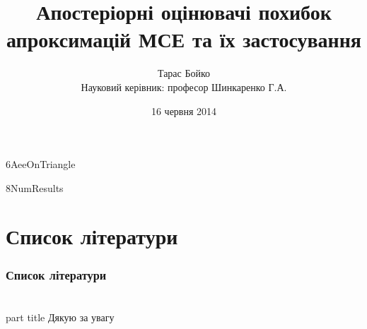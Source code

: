 \documentclass[12pt]{beamer}
\title[Апостеріорні оцінювачі похибок МСЕ]{Апостеріорні оцінювачі похибок апроксимацій МСЕ та їх застосування}
\author[Тарас Бойко]{Тарас Бойко\\[0.4cm] \footnotesize Науковий керівник: професор Шинкаренко Г.А.}
\date{16 червня 2014}
\begin{document}
	

	
	
	
	
	
	{6AeeOnTriangle}
	
	{8NumResults}

	

	\section{Список літератури}
	\frame{\sectionpage}
	\begin{frame}[allowframebreaks]
		\frametitle<presentation>{Список літератури}
		\nocite{*}
		\printbibliography
	\end{frame}

	\section{}

	\begin{frame}
		\begin{centering}
	    \begin{beamercolorbox}[sep=12pt,center]{part title}
	    		Дякую за увагу
	    \end{beamercolorbox}
    \end{centering}
	\end{frame}
\end{document}
